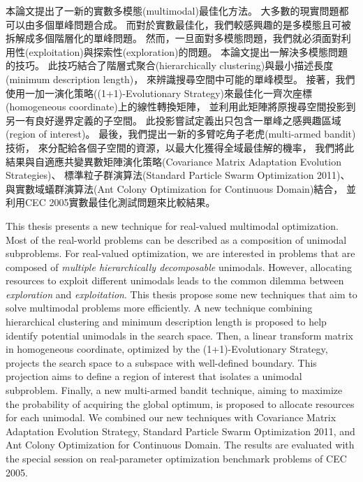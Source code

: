\begin{abstractzh}
本論文提出了一新的實數多模態(multimodal)最佳化方法。
大多數的現實問題都可以由多個單峰問題合成。
而對於實數最佳化，我們較感興趣的是多模態且可被拆解成多個階層化的單峰問題。
然而，一旦面對多模態問題，我們就必須面對利用性(exploitation)與探索性(exploration)的問題。
本論文提出一解決多模態問題的技巧。
此技巧結合了階層式聚合(hierarchically clustering)與最小描述長度(minimum description length)， 來辨識搜尋空間中可能的單峰模型。
接著，我們使用一加一演化策略((1+1)-Evolutionary Strategy)來最佳化一齊次座標(homogeneous coordinate)上的線性轉換矩陣，
並利用此矩陣將原搜尋空間投影到另一有良好邊界定義的子空間。
此投影嘗試定義出只包含一單峰之感興趣區域(region of interest)。
最後，我們提出一新的多臂吃角子老虎(multi-armed bandit)技術，
來分配給各個子空間的資源，以最大化獲得全域最佳解的機率，
我們將此結果與自適應共變異數矩陣演化策略(Covariance Matrix Adaptation Evolution Strategies)、
標準粒子群演算法(Standard Particle Swarm Optimization 2011)、
與實數域蟻群演算法(Ant Colony Optimization for Continuous Domain)結合，
並利用CEC 2005實數最佳化測試問題來比較結果。
\end{abstractzh}

\begin{abstracten}
This thesis presents a new technique for real-valued multimodal optimization.
Most of the real-world problems can be described as a composition of unimodal subproblems.
For real-valued optimization, we are interested in problems that are composed of \textit{multiple hierarchically decomposable} unimodals.
However, allocating resources to exploit different unimodals leads to the 
common dilemma between \textit{exploration} and \textit{exploitation}.
This thesis propose some new techniques that aim to solve multimodal problems more efficiently.
A new technique combining hierarchical clustering and minimum description length
is proposed to help identify potential unimodals in the search space.
Then, a linear transform matrix in homogeneous coordinate, optimized by the (1+1)-Evolutionary Strategy,
projects the search space to a subspace with well-defined boundary.
This projection aims to define a region of interest that isolates a unimodal subproblem.
Finally, a new multi-armed bandit technique, aiming to maximize the probability of acquiring the global optimum,
is proposed to allocate resources for each unimodal.
We combined our new techniques with Covariance Matrix Adaptation Evolution Strategy, 
Standard Particle Swarm Optimization 2011, and Ant Colony Optimization for Continuous Domain.
The results are evaluated with the special session on real-parameter optimization benchmark problems of CEC 2005.
\end{abstracten}

\begin{comment}


\keywords{Real-valued Optimization, Multimodal Optimization, Homogeneous Coordinates, Multi-armed Bandit Algorithm.}
\end{comment}
